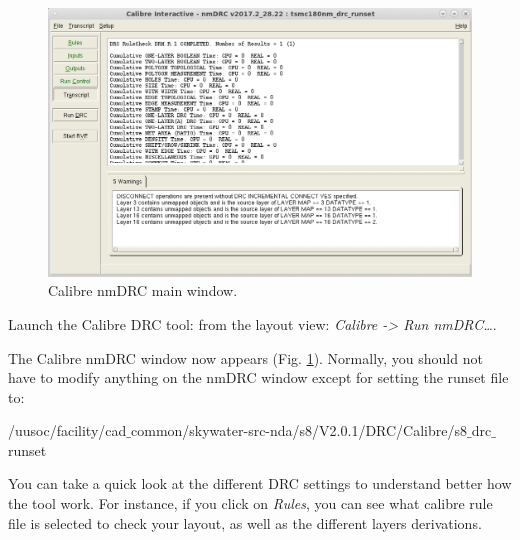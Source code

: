 	\begin{enumerate}

	\begin{figure}
		\vspace{-0mm}
		\centering
		\vspace{1cm}
		\includegraphics[scale=0.2]{figures/lab2_layout/drc_main}
		\caption{Calibre nmDRC main window.}
		\label{fig_drcmain}
	\end{figure}
	\parbox[t]{\dimexpr\textwidth-\leftmargin}{%
		\item Launch the Calibre DRC tool: from the layout view: \textit{Calibre -> Run nmDRC…}.
		\item The Calibre nmDRC window now appears (Fig. \ref{fig_drcmain}). Normally, you should not have to modify anything on the nmDRC window except for setting the runset file to:
		
		\begin{codeline}
			/uusoc/facility/cad$\_$common/skywater-src-nda/s8/V2.0.1/DRC/Calibre/s8$\_$drc$\_$runset
		\end{codeline}
		
		\item You can take a quick look at the different DRC settings to understand better how the tool work. For instance, if you click on \textit{Rules}, you can see what calibre rule file is selected to check your layout, as well as the different layers derivations.		\vspace{2mm}
}


\end{enumerate}
